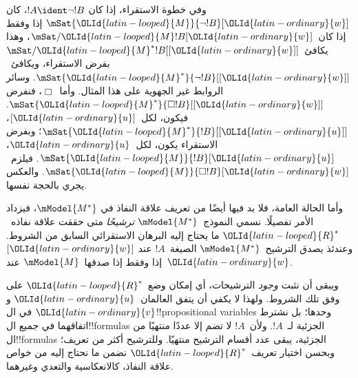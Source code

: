 \documentclass[../../../include/open-logic-section]{subfiles}
\begin{document}
وفي خطوة الاستقراء، إذا كان $!A \ident \lnot !B$،
كان $\mSat{{\OLId{latin-looped}{M}}}{\lnot !B}[{\OLId{latin-ordinary}{w}}]$ إذا وفقط إذا كان~$\mSat/{{\OLId{latin-looped}{M}}}{!B}[{\OLId{latin-ordinary}{w}}]$،
وهذا يكافئ~$\mSat/{{\OLId{latin-looped}{M}}^*}{!B}[{[{\OLId{latin-ordinary}{w}}]}]$ بفرض الاستقراء،
ويكافئ~$\mSat{{\OLId{latin-looped}{M}}^*}{\lnot !B}[{[{\OLId{latin-ordinary}{w}}]}]$. وسائر
الروابط غير الجهوية على هذا المثال.
وأما~$\Box$، فنفرض
$\mSat{{\OLId{latin-looped}{M}}^*}{\Box !B}[{[{\OLId{latin-ordinary}{w}}]}]$. فيكون، لكل~$[{\OLId{latin-ordinary}{u}}]$،
$\mSat{{\OLId{latin-looped}{M}}^*}{!B}[{[{\OLId{latin-ordinary}{u}}]}]$؛ وبفرض الاستقراء يكون، لكل~${\OLId{latin-ordinary}{u}}$،
$\mSat{{\OLId{latin-looped}{M}}}{!B}[{\OLId{latin-ordinary}{u}}]$. فيلزم~$\mSat{{\OLId{latin-looped}{M}}}{\Box !B}[{\OLId{latin-ordinary}{w}}]$.
والعكس يجري بالحجة نفسها.

وأما الحالة العامة، فلا بد فيها أيضًا من تعريف
علاقة النفاذ في $\mModel{M^*}$، فيزداد الأمر تفصيلًا.
نسمي النموذج~$\mModel{M^*}$ \emph{ترشيحًا} متى حققت
علاقة نفاذه~${\OLId{latin-looped}{R}}^*$ ما يحتاج إليه البرهان الاستقرائي
السابق من الشروط. وعندئذ يصدق الترشيح~$\mModel{M^*}$
الصيغة~$!A$ عند $[{\OLId{latin-ordinary}{w}}]$ إذا وفقط إذا صدقها~$\mModel{M}$
عند~${\OLId{latin-ordinary}{w}}$.

ويبقى أن نثبت \emph{وجود} الترشيحات، أي إمكان وضع~${\OLId{latin-looped}{R}}^*$
على وفق تلك الشروط. ولهذا لا يكفي أن يتفق العالمان~${\OLId{latin-ordinary}{u}}$
و${\OLId{latin-ordinary}{v}}$ في ال!!{propositional variable}s وحدها؛ بل
نشترط اتفاقهما في جميع ال!!{formula}s الجزئية لـ~$!A$.
ولأن~$!A$ لا تضم إلا عددًا منتهيًا من ال!!{formula}s
الجزئية، يبقى عدد أقسام الترشيح منتهيًا.
وللترشيح أكثر من تعريف؛ وبحسن اختيار تعريف~${\OLId{latin-looped}{R}}^*$
نضمن ما نحتاج إليه من خواص علاقة النفاذ،
كالانعكاسية والتعدي وغيرهما.
\end{document}
